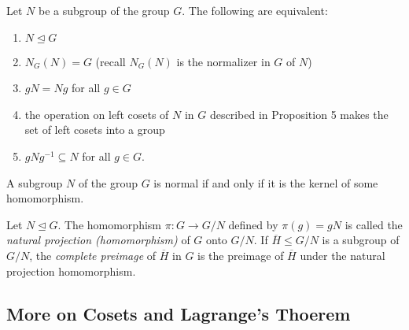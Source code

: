 \documentclass[../main]{subfiles}
\begin{document}
  
  \begin{thm}
   Let $N$ be a subgroup of the group $G$. The following are equivalent:
   \begin{enumerate}
    \item $N \trianglelefteq G$
    \item $N_G(N)=G$ (recall $N_G(N)$ is the normalizer in $G$ of $N$)
    \item $gN=Ng$ for all $g\in G$
    \item the operation on left cosets of $N$ in $G$ described in Proposition 5 makes the set of left cosets into a group
    \item $gNg^{-1} \subseteq N$ for all $g\in G$.
   \end{enumerate}
  \end{thm}
  
  
  \begin{prop}
   A subgroup $N$ of the group $G$ is normal if and only if it is the kernel of some homomorphism.
  \end{prop}
  
  
  \begin{dfn}
   Let $N \trianglelefteq G$. The homomorphism $\pi \colon G \to G/N$ defined by $\pi(g)=gN$ is called the \textit{natural projection (homomorphism)} of $G$ onto $G/N$. If $\overline{H} \leq G/N$ is a subgroup of $G/N$, the \textit{complete preimage} of $\overline{H}$ in $G$ is the preimage of $\overline{H}$ under the natural projection homomorphism. 
  \end{dfn}
  
  
  \subsection{More on Cosets and Lagrange's Thoerem}




  
  
  
\end{document}

